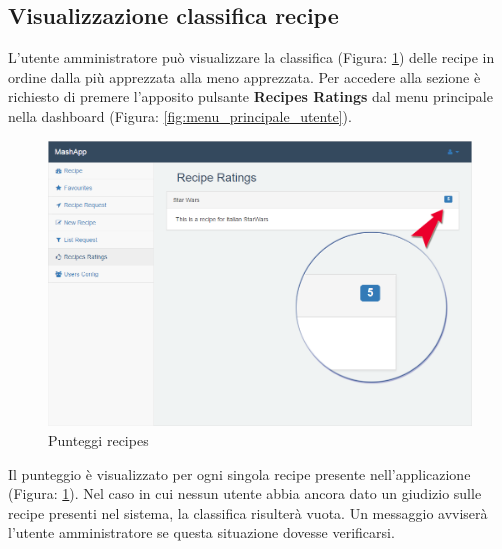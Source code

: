 	\subsection{Visualizzazione classifica recipe}
		L'utente amministratore può visualizzare la classifica (Figura: \ref{fig:votazioni_ricette}) delle recipe\gloss{} in ordine dalla più apprezzata alla meno apprezzata.\newline
		Per accedere alla sezione è richiesto di premere l'apposito pulsante \textbf{Recipes Ratings} dal menu principale nella dashboard\gloss{} (Figura: \ref{fig:menu_principale_utente}).\newline
		\begin{figure}[H]
			\centering
			\centerline{\includegraphics[width=14cm]{images/votazioni_ricette.png}}
			\caption{Punteggi recipes}
			\label{fig:votazioni_ricette}
		\end{figure}
		Il punteggio è visualizzato per ogni singola recipe presente nell'applicazione (Figura: \ref{fig:votazioni_ricette}).
		Nel caso in cui nessun utente abbia ancora dato un giudizio sulle recipe presenti nel sistema, la classifica risulterà vuota.\newline
		Un messaggio avviserà l'utente amministratore se questa situazione dovesse verificarsi.


